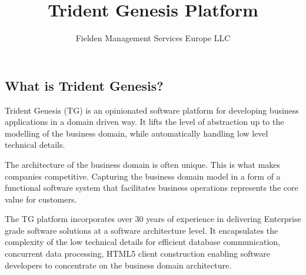 \documentclass[a4paper,10pt,twocolumn,oneside,openright,final]{memoir}
\title{Trident Genesis Platform}
\author{Fielden Management Services Europe LLC}
\begin{document}
\BgThispage

\subsection*{What is Trident Genesis?}
  Trident Genesis (TG) is an opinionated software platform for developing business applications in a domain driven way.
  It lifts the level of abstraction up to the modelling of the business domain, while automatically handling low level technical details.
  
  \vspace{3 mm}
  \noindent The architecture of the business domain is often unique. 
  This is what makes companies competitive.
  Capturing the business domain model in a form of a functional software system that facilitates business operations represents the core value for customers.
  
  \vspace{3 mm}
  \noindent The TG platform incorporates over 30 years of experience in delivering Enterprise grade software solutions at a software architecture level.
  It encapsulates the complexity of the low technical details for efficient database communication, concurrent data processing, HTML5 client construction enabling software developers to concentrate on the business domain architecture.

\begin{figure}[!h]
    \vspace{-5pt} 
    \centering    
    \vspace{0pt} 
  \end{figure}
\end{document}
